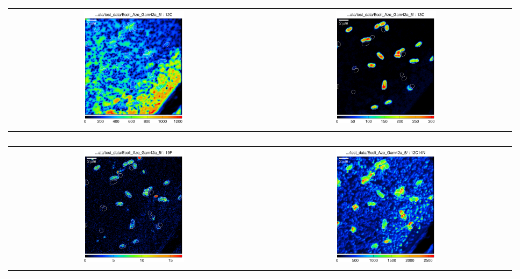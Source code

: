 \documentclass[12pt,a4paper]{article}
\begin{document}
\begin{center}
\begin{tabular}{cc}
\includegraphics[width=0.42\textwidth]{pdf/12C} & \includegraphics[width=0.42\textwidth]{pdf/13C} \\
\end{tabular}
\begin{tabular}{cc}
\includegraphics[width=0.42\textwidth]{pdf/19F} & \includegraphics[width=0.42\textwidth]{pdf/12C14N} \\

\end{tabular}
\end{center}
\end{document}
